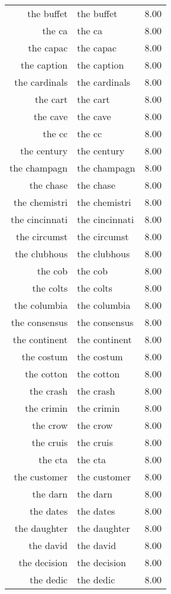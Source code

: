 \begin{table}[ht]
\begin{tabular}{rlr}
  the buffet & the buffet & 8.00 \\ 
  the ca & the ca & 8.00 \\ 
  the capac & the capac & 8.00 \\ 
  the caption & the caption & 8.00 \\ 
  the cardinals & the cardinals & 8.00 \\ 
  the cart & the cart & 8.00 \\ 
  the cave & the cave & 8.00 \\ 
  the cc & the cc & 8.00 \\ 
  the century & the century & 8.00 \\ 
  the champagn & the champagn & 8.00 \\ 
  the chase & the chase & 8.00 \\ 
  the chemistri & the chemistri & 8.00 \\ 
  the cincinnati & the cincinnati & 8.00 \\ 
  the circumst & the circumst & 8.00 \\ 
  the clubhous & the clubhous & 8.00 \\ 
  the cob & the cob & 8.00 \\ 
  the colts & the colts & 8.00 \\ 
  the columbia & the columbia & 8.00 \\ 
  the consensus & the consensus & 8.00 \\ 
  the continent & the continent & 8.00 \\ 
  the costum & the costum & 8.00 \\ 
  the cotton & the cotton & 8.00 \\ 
  the crash & the crash & 8.00 \\ 
  the crimin & the crimin & 8.00 \\ 
  the crow & the crow & 8.00 \\ 
  the cruis & the cruis & 8.00 \\ 
  the cta & the cta & 8.00 \\ 
  the customer & the customer & 8.00 \\ 
  the darn & the darn & 8.00 \\ 
  the dates & the dates & 8.00 \\ 
  the daughter & the daughter & 8.00 \\ 
  the david & the david & 8.00 \\ 
  the decision & the decision & 8.00 \\ 
  the dedic & the dedic & 8.00 \\ 

\end{tabular}
\end{table}

